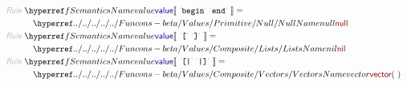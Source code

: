 \begin{align*}
\\
  \KEY{Rule} ~ 
    & \SEMREF{value} \LEFTPHRASE ~ \LEX{begin} ~ \LEX{end} ~ \RIGHTPHRASE  = \\&\quad
      \NAMEHYPER{../../../../../Funcons-beta/Values/Primitive}{Null}{null}
\\
  \KEY{Rule} ~ 
    & \SEMREF{value} \LEFTPHRASE ~ \LEX{[{}} ~ \LEX{]{}} ~ \RIGHTPHRASE  = \\&\quad
      \NAMEHYPER{../../../../../Funcons-beta/Values/Composite}{Lists}{nil}
\\
  \KEY{Rule} ~ 
    & \SEMREF{value} \LEFTPHRASE ~ \LEX{[{}|} ~ \LEX{|]{}} ~ \RIGHTPHRASE  = \\&\quad
      \NAMEHYPER{../../../../../Funcons-beta/Values/Composite}{Vectors}{vector}
        (  ~  )
\end{align*}
